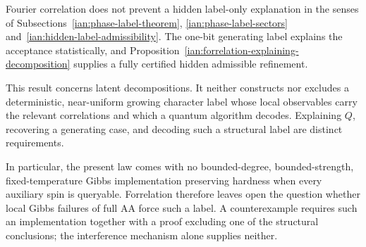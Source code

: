 \begin{remark}\label{ian:forrelation-local-inverse-disposition}
Fourier correlation does not prevent a hidden label-only explanation in the senses of Subsections~\ref{ian:phase-label-theorem}, \ref{ian:phase-label-sectors} and~\ref{ian:hidden-label-admissibility}. The one-bit generating label explains the acceptance statistically, and Proposition~\ref{ian:forrelation-explaining-decomposition} supplies a fully certified hidden admissible refinement.

This result concerns latent decompositions. It neither constructs nor excludes a deterministic, near-uniform growing character label whose local observables carry the relevant correlations and which a quantum algorithm decodes. Explaining \(Q\), recovering a generating case, and decoding such a structural label are distinct requirements.

In particular, the present law comes with no bounded-degree, bounded-strength, fixed-temperature Gibbs implementation preserving hardness when every auxiliary spin is queryable. Forrelation therefore leaves open the question whether local Gibbs failures of full AA force such a label. A counterexample requires such an implementation together with a proof excluding one of the structural conclusions; the interference mechanism alone supplies neither.
\end{remark}

